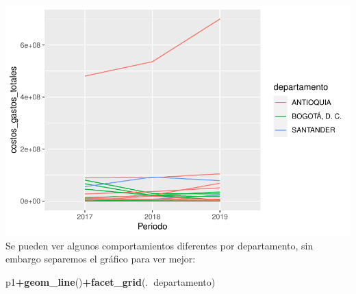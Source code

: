\documentclass[
  11pt,
  a4paper,
]{book}
\newenvironment{Shaded}{\begin{snugshade}}{\end{snugshade}}
\newcommand{\DataTypeTok}[1]{\textcolor[rgb]{0.13,0.29,0.53}{#1}}
\newcommand{\KeywordTok}[1]{\textcolor[rgb]{0.13,0.29,0.53}{\textbf{#1}}}
\newcommand{\NormalTok}[1]{#1}
\newcommand{\OperatorTok}[1]{\textcolor[rgb]{0.81,0.36,0.00}{\textbf{#1}}}
\begin{document}
\begin{Shaded}
\end{Shaded}

\includegraphics{index_files/figure-latex/unnamed-chunk-50-1.pdf} Se
pueden ver algunos comportamientos diferentes por departamento, sin
embargo separemos el gráfico para ver mejor:

\begin{Shaded}
\begin{Highlighting}[]
\NormalTok{p1}\OperatorTok{+}\KeywordTok{geom_line}\NormalTok{()}\OperatorTok{+}\KeywordTok{facet_grid}\NormalTok{(.}\OperatorTok{~}\NormalTok{departamento)}
\end{Highlighting}
\end{Shaded}
\end{document}
